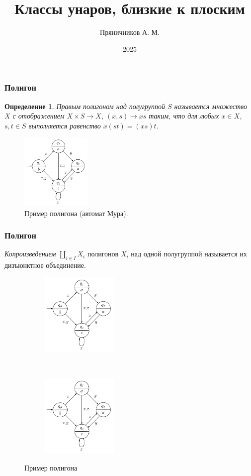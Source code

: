 \documentclass[11pt, notheorems]{beamer}
\title{Классы унаров, близкие к плоским}
\author{Пряничников А. М.}
\date{2025}
\newtheorem{definition}{Определение}
\begin{document}
\frame{\titlepage}

\begin{frame}
	\frametitle{Полигон}

	\begin{definition}
		Правым \textit{полигоном} над полугруппой $S$ называется множество $X$ с отображением $ X \times S \rightarrow X $, $(x, s) \mapsto xs $ таким, что для любых $x \in X$, $s, t \in S$ выполняется равенство $ x (st) = (xs)t $.
	\end{definition}

	\pause

	\begin{figure}
		\center
		\includegraphics[width=0.3\textwidth]{MooreMachine}
		\caption{Пример полигона (автомат Мура).}
	\end{figure}

\end{frame}

\begin{frame}
	\frametitle{Полигон}

	\textit{Копроизведением} $\coprod_{i \in I} X_i$ полигонов $X_i$ над одной полугруппой называется их дизъюнктное объединение.

	\vspace{1cm}

	\begin{figure}[t!]
		\centering
		\begin{subfigure}[t]{0.4\textwidth}
			\centering
			\includegraphics[height=4cm]{MooreMachine.png}
		\end{subfigure}
		~
		\begin{subfigure}[t]{0.4\textwidth}
			\centering
			\includegraphics[height=4cm]{MooreMachine.png}
		\end{subfigure}

		\caption{Пример полигона}
	\end{figure}
\end{frame}
\end{document}
